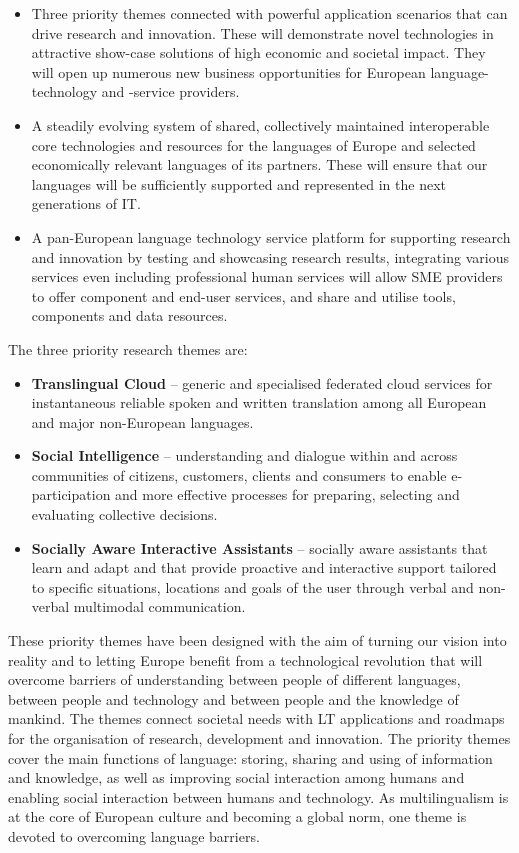 \documentclass[10pt, plain]{../../metanetpaper}
\begin{document}
\begin{multicols}{2}
\begin{itemize}
\item Three priority themes connected with powerful application scenarios that can drive research and innovation. These will demonstrate novel technologies in attractive show-case solutions of high economic and societal impact. They will open up numerous new business opportunities for European language-technology and -service providers.
\item A steadily evolving system of shared, collectively maintained interoperable core technologies and resources for the languages of Europe and selected economically relevant languages of its partners. These will ensure that our languages will be sufficiently supported and represented in the next generations of IT.
\item A pan-European language technology service platform for supporting research and innovation by testing and showcasing research results, integrating various services even including professional human services will allow SME providers to offer component and end-user services, and share and utilise tools, components and data resources. 
\end{itemize}

The three priority research themes are:

\begin{itemize}
\item \textbf{Translingual Cloud} -- generic and specialised federated cloud services for instantaneous reliable spoken and written translation among all European and major non-European languages.
\item \textbf{Social Intelligence} -- understanding and dialogue within and across communities of citizens, customers, clients and consumers to enable e-participation and more effective processes for preparing, selecting and evaluating collective decisions.
\item \textbf{Socially Aware Interactive Assistants} -- socially aware assistants that learn and adapt and that provide proactive and interactive support tailored to specific situations, locations and goals of the user through verbal and non-verbal multimodal communication.
\end{itemize}

These priority themes have been designed with the aim of turning our vision into reality and to letting Europe benefit from a technological revolution that will overcome barriers of understanding between people of different languages, between people and technology and between people and the knowledge of mankind. The themes connect societal needs with LT applications and roadmaps for the organisation of research, development and innovation. The priority themes cover the main functions of language: storing, sharing and using of information and knowledge, as well as improving social interaction among humans and enabling social interaction between humans and technology. As multilingualism is at the core of European culture and becoming a global norm, one theme is devoted to overcoming language barriers. 


\end{multicols}
\end{document}
